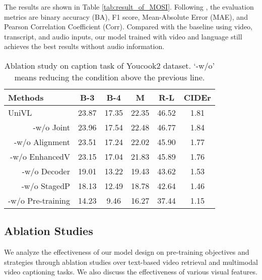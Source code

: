 \documentclass[11pt,a4paper]{article}
\begin{document}
	The results are shown in Table \ref{tab:result_of_MOSI}. Following \cite{Zadeh2019Factorized}, the evaluation metrics are binary accuracy (BA), F1 score, Mean-Absolute Error (MAE), and Pearson Correlation Coefficient (Corr). Compared with the baseline using video, transcript, and audio inputs, our model trained with video and language still achieves the best results without audio information.
	\begin{table*}[tp] 
		\centering
		\setlength{\tabcolsep}{5pt} \begin{tabular}{lccccc}
			\toprule
			Methods  & B-3 & B-4 & M & R-L & CIDEr \\ 
			\midrule
			UniVL & 23.87 & 17.35 & 22.35 & 46.52 & 1.81  \\ 
			\multicolumn{1}{r}{-w/o Joint}  & 23.96 & 17.54 & 22.48 & 46.77 & 1.84   \\ 
			\multicolumn{1}{r}{-w/o Alignment}   & 23.51 & 17.24 & 22.02 & 45.90 & 1.77  \\ 
			\multicolumn{1}{r}{-w/o EnhancedV}  & 23.15 & 17.04 & 21.83 & 45.89 & 1.76 \\ 
			\multicolumn{1}{r}{-w/o Decoder}   & 19.01 & 13.22 & 19.43 & 43.62 & 1.53 \\ 
			\multicolumn{1}{r}{-w/o StagedP}   & 18.13 & 12.49 & 18.78 & 42.64 & 1.46   \\ 
			\multicolumn{1}{r}{-w/o Pre-training} & 14.23	& 9.46	& 16.27	& 37.44	& 1.15 \\
			\bottomrule
		\end{tabular}
\caption{Ablation study on caption task of Youcook2 dataset. `-w/o' means reducing the condition above the previous line.}
		\label{tab:result_of_ablation_caption}
	\end{table*}
	
	\subsection{Ablation Studies}
	We analyze the effectiveness of our model design on pre-training objectives and strategies through ablation studies over text-based video retrieval and multimodal video captioning tasks. We also discuss the effectiveness of various visual features.
	
\end{document}
